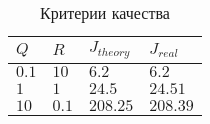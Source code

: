 \begin{table}[h!]
        \centering
        \begin{tabular}{| l | l | l | l |} 
            \hline
            $Q$ & $R$ & $J_{theory}$ & $J_{real}$  \\  
            \hline
            $0.1$ & $10$ & $6.2$ & $6.2$  \\  
            $1$ & $1$ & $24.5$ & $24.51$  \\  
            $10$ & $0.1$ & $208.25$ & $208.39$  \\  
        \end{tabular}
        \caption{Критерии качества}
        \label{table:task1}
    \end{table}

\FloatBarrier